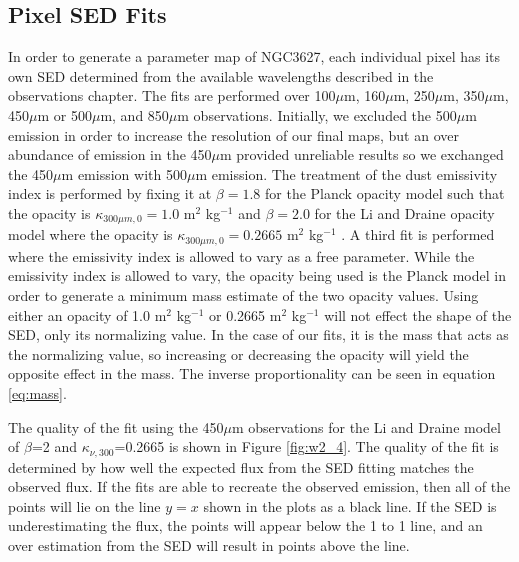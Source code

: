 \subsection{Pixel SED Fits}

In order to generate a parameter map of NGC3627, each individual pixel has its own SED determined from the available wavelengths described in the observations chapter.  The fits are performed over 100$\mu$m, 160$\mu$m, 250$\mu$m, 350$\mu$m, 450$\mu$m or 500$\mu$m, and 850$\mu$m observations.  Initially, we excluded the 500$\mu$m emission in order to increase the resolution of our final maps, but an over abundance of emission in the 450$\mu$m provided unreliable results so we exchanged the 450$\mu$m emission with 500$\mu$m emission.  The treatment of the dust emissivity index is performed by fixing it at $\beta=1.8$ for the Planck opacity model such that the opacity is $\kappa_{300\mu m,0}=1.0$ m$^2$ kg$^{-1}$ \citep{planckxxv2011} and $\beta=2.0$ for the Li and Draine opacity model where the opacity is $\kappa_{300\mu m,0}=0.2665$ m$^2$ kg$^{-1}$ \citep{li2001}.  A third fit is performed where the emissivity index is allowed to vary as a free parameter.  While the emissivity index is allowed to vary, the opacity being used is the Planck model in order to generate a minimum mass estimate of the two opacity values.  Using either an opacity of 1.0 m$^2$ kg$^{-1}$ or 0.2665 m$^2$ kg$^{-1}$ will not effect the shape of the SED, only its normalizing value.  In the case of our fits, it is the mass that acts as the normalizing value, so increasing or decreasing the opacity will yield the opposite effect in the mass.  The inverse proportionality can be seen in equation \ref{eq:mass}.  

The quality of the fit using the 450$\mu$m observations for the Li and Draine model of $\beta$=2 and $\kappa_{\nu,300}$=0.2665 is shown in Figure \ref{fig:w2_4}.  The quality of the fit is determined by how well the expected flux from the SED fitting matches the observed flux.  If the fits are able to recreate the observed emission, then all of the points will lie on the line $y=x$ shown in the plots as a black line.  If the SED is underestimating the flux, the points will appear below the 1 to 1 line, and an over estimation from the SED will result in points above the line.  

